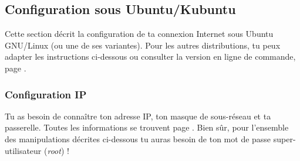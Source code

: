




\subsection{Configuration sous Ubuntu/Kubuntu}

Cette section décrit la configuration de ta connexion Internet sous Ubuntu GNU/Linux (ou une de ses variantes). Pour les autres distributions, tu peux adapter les instructions ci-dessous ou consulter la version 
en ligne de commande, page \pageref{linux_cmdline}.

\subsubsection{Configuration IP}
Tu as besoin de conna\^itre ton adresse IP, ton masque de sous-r\'eseau et ta  passerelle. Toutes les informations se trouvent page \pageref{calcul_ip}. Bien s\^ur, pour  l'ensemble des manipulations d\'ecrites ci-dessous tu auras besoin de ton  mot de passe super-utilisateur (\emph{root}) !

